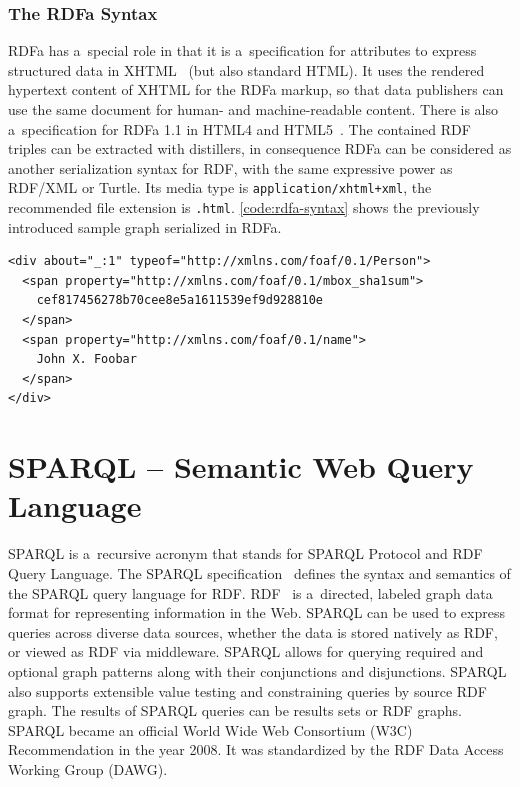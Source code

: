 \subsubsection{The RDFa Syntax}
RDFa has a~special role in that it is a~specification for attributes to express structured data
in XHTML~\cite{Adida2008} (but also standard HTML).
It uses the rendered hypertext content of XHTML for the RDFa markup,
so that data publishers can use the same document for human- and machine-readable content.
There is also a~specification for RDFa 1.1 in HTML4 and HTML5~\cite{Sporny2011}.
The contained RDF triples can be extracted with distillers,
in consequence RDFa can be considered as another serialization syntax for RDF,
with the same expressive power as RDF/XML or Turtle.
Its media type is \texttt{application/xhtml+xml}, the recommended file extension is \texttt{.html}.
\autoref{code:rdfa-syntax} shows the previously introduced sample graph serialized in RDFa.

\begin{lstlisting}[caption={A sample graph in RDFa syntax.},label={code:rdfa-syntax}]
<div about="_:1" typeof="http://xmlns.com/foaf/0.1/Person">           
  <span property="http://xmlns.com/foaf/0.1/mbox_sha1sum">
    cef817456278b70cee8e5a1611539ef9d928810e
  </span> 
  <span property="http://xmlns.com/foaf/0.1/name">
    John X. Foobar
  </span>
</div> 
\end{lstlisting}

\section{SPARQL -- Semantic Web Query Language}
SPARQL is a~recursive acronym that stands for SPARQL Protocol and RDF Query Language.
The SPARQL specification~\cite{Prudhommeaux2008} defines the syntax and semantics
of the SPARQL query language for RDF.
RDF~\cite{Klyne2004} is a~directed, labeled graph data format for representing information in the Web.
SPARQL can be used to express queries across diverse data sources,
whether the data is stored natively as RDF, or viewed as RDF via middleware.
SPARQL allows for querying required and optional graph patterns
along with their conjunctions and disjunctions.
SPARQL also supports extensible value testing and constraining queries by source RDF graph.
The results of SPARQL queries can be results sets or RDF graphs.
SPARQL became an official World Wide Web Consortium (W3C) Recommendation in the year 2008.
It was standardized by the RDF Data Access Working Group (DAWG).

